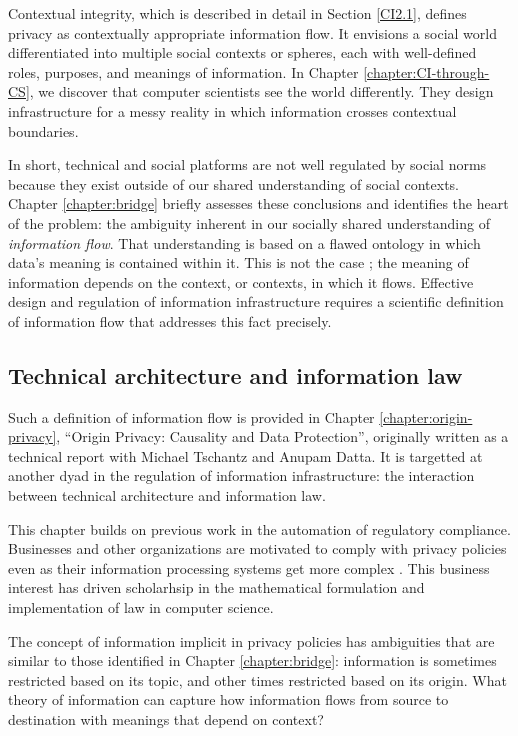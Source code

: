 \documentclass[../thesis.tex]{subfiles}
\begin{document}
 Contextual integrity, which is described in detail in
 Section \ref{CI2.1}, defines privacy as contextually
 appropriate information flow.
 It envisions a social world differentiated into multiple
 social contexts or spheres, each with well-defined
 roles, purposes, and meanings of information.
 In Chapter \ref{chapter:CI-through-CS}, we discover that
 computer scientists see the world differently.
 They design infrastructure for a messy reality in which
 information crosses contextual boundaries.

 In short, technical and social platforms are not well
 regulated by social norms because they exist outside
 of our shared understanding of social contexts.
 Chapter \ref{chapter:bridge} briefly assesses these conclusions
 and identifies the  heart of the problem:
 the ambiguity inherent in our socially shared
 understanding of \textit{information flow}.
 That understanding is based on a flawed ontology
 in which data's meaning is contained within it.
 This is not the case \cite{horvitz2015data};
 the meaning of information depends on the context,
 or contexts, in which it flows.
 Effective design and regulation of information
 infrastructure requires a scientific
 definition of information flow that addresses this
 fact precisely.
 
 \subsection{Technical architecture and information law}

 Such a definition of information flow is provided in
 Chapter \ref{chapter:origin-privacy},
 ``Origin Privacy: Causality and Data Protection'', originally
 written as a technical report
 with Michael Tschantz and Anupam Datta. 
 It is targetted at another dyad in the regulation of information
 infrastructure: the interaction between technical architecture
 and information law.

 This chapter builds on previous work in the automation of
 regulatory compliance.
 Businesses and other organizations are motivated to comply
 with privacy policies even as their information
 processing systems get more complex \cite{barth2007privacy}
 \cite{deyoung2010experiences} \cite{sen2014bootstrapping}.
 This business interest has driven scholarhsip in the
 mathematical formulation and implementation of law
 in computer science.

 The concept of information implicit in privacy policies
 has ambiguities that are similar to those identified
 in Chapter \ref{chapter:bridge}: information is sometimes
 restricted based on its topic, and other times restricted
 based on its origin.
 What theory of information can capture how information
 flows from source to destination with meanings that depend
 on context?
\end{document}

